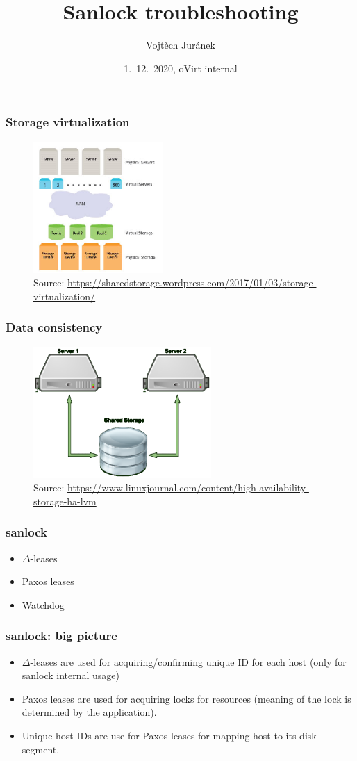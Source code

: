 \documentclass[10pt,utf8]{beamer}
\title{Sanlock troubleshooting}
\author{Vojtěch Juránek}
\institute[Red Hat]{oVirt storage team}
\date{1.~12.~2020, oVirt internal}
\begin{document}
\begin{frame}
    \titlepage
\end{frame}

\begin{frame}
  \frametitle{Storage virtualization}
  \begin{figure}
    \centering
    \includegraphics[height=5cm]{./img/virt-storage.eps}
    \caption{\tiny{Source: \url{https://sharedstorage.wordpress.com/2017/01/03/storage-virtualization/}}}
  \end{figure}
\end{frame}

\begin{frame}
  \frametitle{Data consistency}
  \begin{figure}
    \centering
    \includegraphics[height=5cm]{./img/disk-paxos.eps}
    \caption{\tiny{Source: \url{https://www.linuxjournal.com/content/high-availability-storage-ha-lvm}}}
 \end{figure}
\end{frame}

\begin{frame}
  \frametitle{sanlock}
  \begin{itemize}
    \item $\Delta$-leases 
    \item Paxos leases
    \item Watchdog
  \end{itemize}
\end{frame}

\begin{frame}
  \frametitle{sanlock: big picture}
  \begin{itemize}
    \item $\Delta$-leases are used for acquiring/confirming unique ID for each host (only for sanlock internal usage)
    \item Paxos leases are used for acquiring locks for resources (meaning of the lock is determined by the application).
    \item Unique host IDs are use for Paxos leases for mapping host to its disk segment.
  \end{itemize}
\end{frame}
\end{document}
